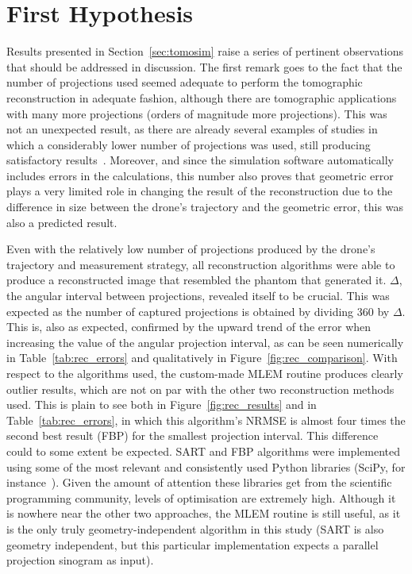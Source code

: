 \section{First Hypothesis}%
\label{sec:first_hypothesis}

Results presented in Section~\ref{sec:tomosim}  raise a series of
pertinent observations that should be addressed in discussion. The first
remark goes to the fact that the number of projections used seemed
adequate to perform the tomographic reconstruction in adequate fashion,
although there are tomographic applications with many more projections
(orders of magnitude more projections).  This was not an unexpected
result, as there are already several examples of studies in which a
considerably lower number of projections was used, still producing
satisfactory results~\cite{Pundt2005}.  Moreover, and since the
simulation software automatically includes errors in the calculations,
this number also proves that geometric error plays a very limited role
in changing the result of the reconstruction due to the difference in
size between the drone's trajectory and the geometric error, this was
also a predicted result.

Even with the relatively low number of projections produced by the
drone's trajectory and measurement strategy, all reconstruction
algorithms were able to produce a reconstructed image that resembled the
phantom that generated it. $\Delta$, the angular interval between
projections, revealed itself to be crucial. This was expected as the
number of captured projections is obtained by dividing 360 by $\Delta$.
This is, also as expected, confirmed by the upward trend of the error
when increasing the value of the angular projection interval, as can be
seen numerically in Table~\ref{tab:rec_errors} and qualitatively in
Figure~\ref{fig:rec_comparison}. With respect to the algorithms used,
the custom-made MLEM routine produces clearly outlier results, which are
not on par with the other two reconstruction methods used. This is plain
to see both in Figure~\ref{fig:rec_results} and in
Table~\ref{tab:rec_errors}, in which this algorithm's NRMSE is almost
four times the second best result (FBP) for the smallest projection
interval. This difference could to some extent be expected. SART and FBP
algorithms were implemented using some of the most relevant and
consistently used Python libraries (SciPy, for
instance~\cite{Virtanen2020}). Given the amount of attention these
libraries get from the scientific programming community, levels of
optimisation are extremely high. Although it is nowhere near the other
two approaches, the MLEM routine is still useful, as it is the only
truly geometry-independent algorithm in this study (SART is also
geometry independent, but this particular implementation expects a
parallel projection sinogram as input).

